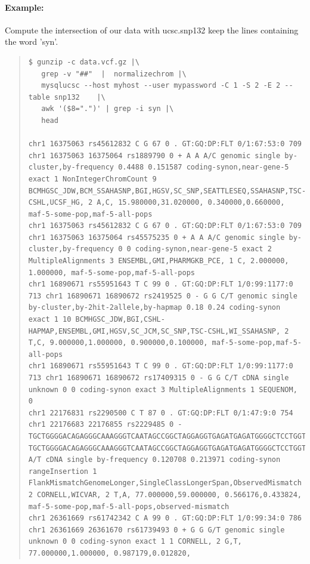 \documentclass[12pt]{article}
\begin{document}
\paragraph{Example:}
Compute the intersection of our data with ucsc.snp132 keep the lines containing the word 'syn'.
\begin{quote}
\begin{verbatim}
$ gunzip -c data.vcf.gz |\
   grep -v "##"  |  normalizechrom |\
   mysqlucsc --host myhost --user mypassword -C 1 -S 2 -E 2 --table snp132    |\
   awk '($8=".")' | grep -i syn |\
   head
   
chr1 16375063 rs45612832 C G 67 0 . GT:GQ:DP:FLT 0/1:67:53:0 709 chr1 16375063 16375064 rs1889790 0 + A A A/C genomic single by-cluster,by-frequency 0.4488 0.151587 coding-synon,near-gene-5 exact 1 NonIntegerChromCount 9 BCMHGSC_JDW,BCM_SSAHASNP,BGI,HGSV,SC_SNP,SEATTLESEQ,SSAHASNP,TSC-CSHL,UCSF_HG, 2 A,C, 15.980000,31.020000, 0.340000,0.660000, maf-5-some-pop,maf-5-all-pops
chr1 16375063 rs45612832 C G 67 0 . GT:GQ:DP:FLT 0/1:67:53:0 709 chr1 16375063 16375064 rs45575235 0 + A A A/C genomic single by-cluster,by-frequency 0 0 coding-synon,near-gene-5 exact 2 MultipleAlignments 3 ENSEMBL,GMI,PHARMGKB_PCE, 1 C, 2.000000, 1.000000, maf-5-some-pop,maf-5-all-pops
chr1 16890671 rs55951643 T C 99 0 . GT:GQ:DP:FLT 1/0:99:1177:0 713 chr1 16890671 16890672 rs2419525 0 - G G C/T genomic single by-cluster,by-2hit-2allele,by-hapmap 0.18 0.24 coding-synon exact 1 10 BCMHGSC_JDW,BGI,CSHL-HAPMAP,ENSEMBL,GMI,HGSV,SC_JCM,SC_SNP,TSC-CSHL,WI_SSAHASNP, 2 T,C, 9.000000,1.000000, 0.900000,0.100000, maf-5-some-pop,maf-5-all-pops
chr1 16890671 rs55951643 T C 99 0 . GT:GQ:DP:FLT 1/0:99:1177:0 713 chr1 16890671 16890672 rs17409315 0 - G G C/T cDNA single unknown 0 0 coding-synon exact 3 MultipleAlignments 1 SEQUENOM, 0
chr1 22176831 rs2290500 C T 87 0 . GT:GQ:DP:FLT 0/1:47:9:0 754 chr1 22176683 22176855 rs2229485 0 - TGCTGGGGACAGAGGGCAAAGGGTCAATAGCCGGCTAGGAGGTGAGATGAGATGGGGCTCCTGGTCTCAAGGCAGGTGCAGTCTGCGGCTTGGCCTCCTGATCCTGCCGTTGCAAGAGTGGGGGGCCTCCCACCCTGGGTCCCCAGCCCTGCCCTCCCTGAGAGCTACTCAC TGCTGGGGACAGAGGGCAAAGGGTCAATAGCCGGCTAGGAGGTGAGATGAGATGGGGCTCCTGGTCTCAAGGCAGGTGCAGTCTGCGGCTTGGCCTCCTGATCCTGCCGTTGCAAGAGTGGGGGGCCTCCCACCCTGGGTCCCCAGCCCTGCCCTCCCTGAGAGCTACTCAC A/T cDNA single by-frequency 0.120708 0.213971 coding-synon rangeInsertion 1 FlankMismatchGenomeLonger,SingleClassLongerSpan,ObservedMismatch 2 CORNELL,WICVAR, 2 T,A, 77.000000,59.000000, 0.566176,0.433824, maf-5-some-pop,maf-5-all-pops,observed-mismatch
chr1 26361669 rs61742342 C A 99 0 . GT:GQ:DP:FLT 1/0:99:34:0 786 chr1 26361669 26361670 rs61739493 0 + G G G/T genomic single unknown 0 0 coding-synon exact 1 1 CORNELL, 2 G,T, 77.000000,1.000000, 0.987179,0.012820,

\end{verbatim}
\end{quote}
\end{document}

